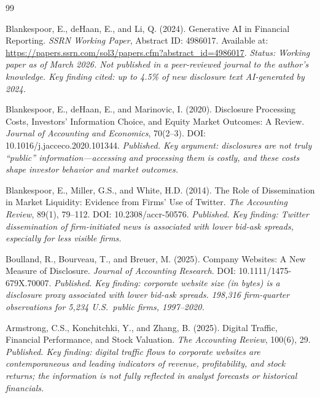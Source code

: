 \documentclass[12pt,a4paper]{article}
\begin{document}
\newpage
\begin{thebibliography}{99}

Blankespoor, E., deHaan, E., and Li, Q. (2024).
\newblock Generative AI in Financial Reporting.
\newblock \emph{SSRN Working Paper}, Abstract ID: 4986017.
\newblock Available at: \url{https://papers.ssrn.com/sol3/papers.cfm?abstract_id=4986017}.
\newblock \textit{Status: Working paper as of March 2026. Not published in a peer-reviewed journal to the author's knowledge. Key finding cited: up to 4.5\% of new disclosure text AI-generated by 2024.}

Blankespoor, E., deHaan, E., and Marinovic, I. (2020).
\newblock Disclosure Processing Costs, Investors' Information Choice, and Equity Market Outcomes: A Review.
\newblock \emph{Journal of Accounting and Economics}, 70(2--3).
\newblock DOI: 10.1016/j.jacceco.2020.101344.
\newblock \textit{Published. Key argument: disclosures are not truly ``public'' information---accessing and processing them is costly, and these costs shape investor behavior and market outcomes.}

Blankespoor, E., Miller, G.S., and White, H.D. (2014).
\newblock The Role of Dissemination in Market Liquidity: Evidence from Firms' Use of Twitter.
\newblock \emph{The Accounting Review}, 89(1), 79--112.
\newblock DOI: 10.2308/accr-50576.
\newblock \textit{Published. Key finding: Twitter dissemination of firm-initiated news is associated with lower bid-ask spreads, especially for less visible firms.}

Boulland, R., Bourveau, T., and Breuer, M. (2025).
\newblock Company Websites: A New Measure of Disclosure.
\newblock \emph{Journal of Accounting Research}.
\newblock DOI: 10.1111/1475-679X.70007.
\newblock \textit{Published. Key finding: corporate website size (in bytes) is a disclosure proxy associated with lower bid-ask spreads. 198,316 firm-quarter observations for 5,234 U.S.\ public firms, 1997--2020.}

Armstrong, C.S., Konchitchki, Y., and Zhang, B. (2025).
\newblock Digital Traffic, Financial Performance, and Stock Valuation.
\newblock \emph{The Accounting Review}, 100(6), 29.
\newblock \textit{Published. Key finding: digital traffic flows to corporate websites are contemporaneous and leading indicators of revenue, profitability, and stock returns; the information is not fully reflected in analyst forecasts or historical financials.}


\end{thebibliography}
\end{document}
